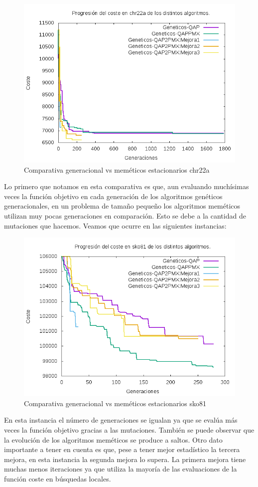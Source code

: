 \begin{figure}[H]
\centering
\includegraphics[width=0.7\linewidth]{graficos/comparativaGeneracionalchr22a}
\caption{Comparativa generacional vs meméticos estacionarios chr22a}
\label{fig:comparativaGeneracionalchr22a}
\end{figure}

Lo primero que notamos en esta comparativa es que, aun evaluando muchísimas veces la función objetivo en cada generación de los algoritmos genéticos generacionales, en un problema de tamaño pequeño los algoritmos meméticos utilizan muy pocas generaciones en comparación. Esto se debe a la cantidad de mutaciones que hacemos. Veamos que ocurre en las siguientes instancias:\\

\begin{figure}[H]
\centering
\includegraphics[width=0.7\linewidth]{graficos/comparativaGeneracionalsko81}
\caption{Comparativa generacional vs meméticos estacionarios sko81}
\label{fig:comparativaGeneracionalsko81}
\end{figure}

En esta instancia el número de generaciones se igualan ya que se evalúa más veces la función objetivo gracias a las mutaciones. También se puede observar que la evolución de los algoritmos meméticos se produce a saltos. Otro dato importante a tener en cuenta es que, pese a tener mejor estadístico la tercera mejora,  en esta instancia la segunda mejora lo supera. La primera mejora tiene muchas menos iteraciones ya que utiliza la mayoría de las evaluaciones de la función coste en búsquedas locales.\\

